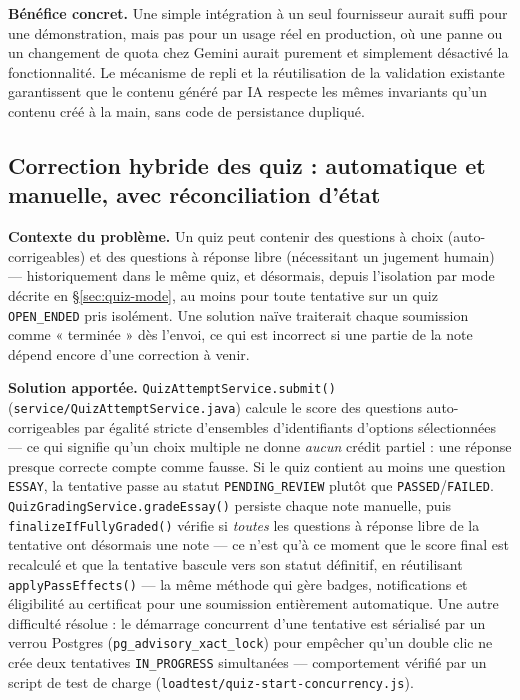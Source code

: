 \textbf{Bénéfice concret.} Une simple intégration à un seul fournisseur
aurait suffi pour une démonstration, mais pas pour un usage réel en
production, où une panne ou un changement de quota chez Gemini aurait
purement et simplement désactivé la fonctionnalité. Le mécanisme de repli
et la réutilisation de la validation existante garantissent que le contenu
généré par IA respecte les mêmes invariants qu'un contenu créé à la main,
sans code de persistance dupliqué.

\subsection{Correction hybride des quiz : automatique et manuelle, avec réconciliation d'état}
\label{sec:correction-hybride}

\textbf{Contexte du problème.} Un quiz peut contenir des questions à choix
(auto-corrigeables) et des questions à réponse libre (nécessitant un
jugement humain) --- historiquement dans le même quiz, et désormais, depuis
l'isolation par mode décrite en \S\ref{sec:quiz-mode}, au moins pour toute
tentative sur un quiz \texttt{OPEN\_ENDED} pris isolément. Une solution
naïve traiterait chaque soumission comme « terminée » dès l'envoi, ce qui
est incorrect si une partie de la note dépend encore d'une correction à
venir.

\textbf{Solution apportée.} \texttt{Quiz\allowbreak Attempt\allowbreak Service.submit()}
(\texttt{service/\allowbreak Quiz\allowbreak Attempt\allowbreak Service.java}) calcule le score des questions
auto-corrigeables par égalité stricte d'ensembles d'identifiants
d'options sélectionnées --- ce qui signifie qu'un choix multiple ne donne
\emph{aucun} crédit partiel : une réponse presque correcte compte comme
fausse. Si le quiz contient au moins une question \texttt{ESSAY}, la
tentative passe au statut \texttt{PENDING\_REVIEW} plutôt que
\texttt{PASSED}/\texttt{FAILED}. \texttt{QuizGradingService.gradeEssay()}
persiste chaque note manuelle, puis \texttt{finalizeIfFullyGraded()}
vérifie si \emph{toutes} les questions à réponse libre de la tentative ont
désormais une note --- ce n'est qu'à ce moment que le score final est
recalculé et que la tentative bascule vers son statut définitif, en
réutilisant \texttt{applyPassEffects()} --- la même méthode qui gère
badges, notifications et éligibilité au certificat pour une soumission
entièrement automatique. Une autre difficulté résolue : le démarrage
concurrent d'une tentative est sérialisé par un verrou Postgres
(\texttt{pg\_advisory\_xact\_lock}) pour empêcher qu'un double clic ne crée
deux tentatives \texttt{IN\_PROGRESS} simultanées --- comportement vérifié
par un script de test de charge (\texttt{loadtest/quiz-start-concurrency.js}).

